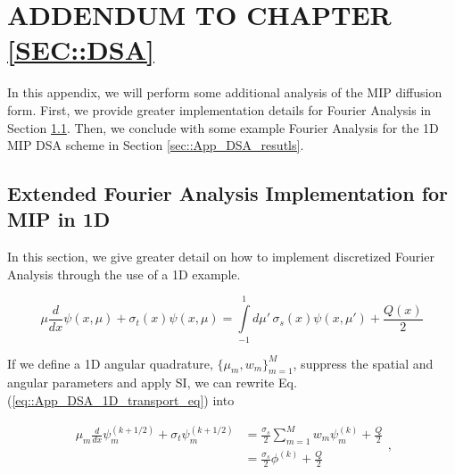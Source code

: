 %
%
%


\chapter{\uppercase {Addendum to Chapter \ref{sec::DSA}}}
\label{sec::appendix_DSA}

In this appendix, we will perform some additional analysis of the MIP diffusion form. First, we provide greater implementation details for Fourier Analysis in Section \ref{sec::App_DSA_fourier}. Then, we conclude with some example Fourier Analysis for the 1D MIP DSA scheme in Section \ref{sec::App_DSA_resutls}.

\section{Extended Fourier Analysis Implementation for MIP in 1D}
\label{sec::App_DSA_fourier}

In this section, we give greater detail on how to implement discretized Fourier Analysis through the use of a 1D example.

\begin{equation}
\label{eq::App_DSA_1D_transport_eq}
\mu \frac{d }{d x} \psi (x,\mu) + \sigma_t (x) \psi(x,\mu) = \int\limits_{-1}^{1} d\mu'  \, \sigma_s (x) \psi(x,\mu') + \frac{Q(x)}{2}
\end{equation}

\noindent If we define a 1D angular quadrature, $\{  \mu_m, w_m \}_{m=1}^M$, suppress the spatial and angular parameters and apply SI, we can rewrite Eq. (\ref{eq::App_DSA_1D_transport_eq}) into

\begin{equation}
\label{eq::App_DSA_1D_transport_discangle}
\begin{aligned}
\mu_m \frac{d }{d x} \psi_m^{(k+1/2)} + \sigma_t \psi_m^{(k+1/2)} &= \frac{\sigma_s}{2} \sum_{m=1}^M w_m \psi_m^{(k)} + \frac{Q}{2} \\
&= \frac{\sigma_s }{2} \phi^{(k)}  + \frac{Q}{2}
\end{aligned} ,
\end{equation}

